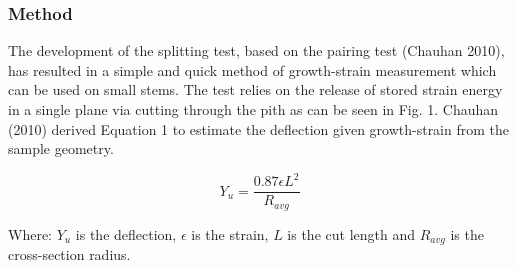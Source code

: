 \subsubsection*{Method}
The development of the splitting test, based on the pairing test (Chauhan 2010), has resulted in a simple and quick method of growth-strain measurement which can be used on small stems. The test relies on the release of stored strain energy in a single plane via cutting through the pith as can be seen in Fig. 1. Chauhan (2010) derived Equation 1 to estimate the deflection given growth-strain from the sample geometry.

\begin{equation}
Y_u = \frac{0.87 \epsilon L^2}{R_{avg}}
\end{equation}
  
 Where: \(Y_u\) is the deflection, \(\epsilon\) is the strain, \(L\) is the cut length and \(R_{avg}\) is the cross-section radius. 